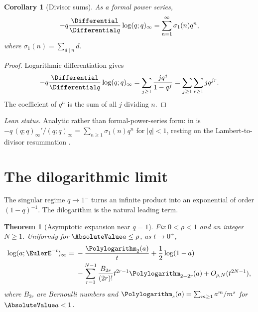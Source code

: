 \documentclass[11pt,a4paper,oneside,openany]{book}
\newtheorem{theorem}{Theorem}[chapter]
\newtheorem{corollary}[corollary]{Corollary}
\theoremstyle{definition}
\theoremstyle{remark}
\begin{document}
\begin{corollary}[Divisor sums]\label{cor:divisor-sum}
As a formal power series,
\[
 -q\frac{\Differential}{\Differential q}\log(q;q)_\infty
 =\sum_{n=1}^{\infty}\sigma_1(n)q^n,
\]
where $\sigma_1(n)=\sum_{d\mid n}d$.
\end{corollary}

\begin{proof}
Logarithmic differentiation gives
\[
 -q\frac{\Differential}{\Differential q}\log(q;q)_\infty
 =\sum_{j\ge1}\frac{j q^j}{1-q^j}
 =\sum_{j\ge1}\sum_{r\ge1}j q^{jr}.
\]
The coefficient of $q^n$ is the sum of all $j$ dividing $n$.
\end{proof}

\emph{Lean status.}  Analytic rather than formal-power-series form:
 in  is
$-q\,(q;q)_\infty'/(q;q)_\infty=\sum_{n\ge1}\sigma_1(n)q^n$ for $|q|<1$, resting on the
Lambert-to-divisor resummation .


\section{The dilogarithmic limit}

The singular regime $q\to1^-$ turns an infinite product into an exponential of order $(1-q)^{-1}$.  The dilogarithm is the natural leading term.

\begin{theorem}[Asymptotic expansion near $q=1$]\label{thm:poch-dilog}
Fix $0<\rho<1$ and an integer $N\ge1$.  Uniformly for $\AbsoluteValue a\le\rho$, as $t\to0^+$,
\[
\begin{aligned}
 \log(a;\EulerE^{-t})_\infty
 ={}&-\frac{\Polylogarithm_2(a)}{t}+\frac12\log(1-a)\\
 &-\sum_{r=1}^{N-1}\frac{B_{2r}}{(2r)!}
 t^{2r-1}\Polylogarithm_{2-2r}(a)+O_{\rho,N}(t^{2N-1}),
\end{aligned}
\]
where $B_{2r}$ are Bernoulli numbers and
\(
 \Polylogarithm_s(a)=\sum_{m\ge1}a^m/m^s
\)
for $\AbsoluteValue a<1$.
\end{theorem}
\end{document}
